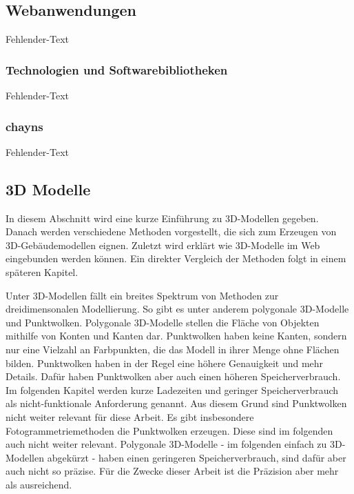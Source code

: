 \subsection{Webanwendungen}
Fehlender-Text

\subsubsection{Technologien und Softwarebibliotheken}
Fehlender-Text

\subsubsection{chayns}
Fehlender-Text

\subsection{3D Modelle}
In diesem Abschnitt wird eine kurze Einführung zu 3D-Modellen gegeben. Danach werden verschiedene Methoden vorgestellt, die sich zum Erzeugen von 3D-Gebäudemodellen eignen. Zuletzt wird erklärt wie 3D-Modelle im Web eingebunden werden können. Ein direkter Vergleich der Methoden folgt in einem späteren Kapitel.

Unter 3D-Modellen fällt ein breites Spektrum von Methoden zur dreidimensonalen Modellierung. So gibt es unter anderem polygonale 3D-Modelle und Punktwolken. Polygonale 3D-Modelle stellen die Fläche von Objekten mithilfe von Konten und Kanten dar. Punktwolken haben keine Kanten, sondern nur eine Vielzahl an Farbpunkten, die das Modell in ihrer Menge ohne Flächen bilden. Punktwolken haben in der Regel eine höhere Genauigkeit und mehr Details. Dafür haben Punktwolken aber auch einen höheren Speicherverbrauch. Im folgenden Kapitel werden kurze Ladezeiten und geringer Speicherverbrauch als nicht-funktionale Anforderung genannt. Aus diesem Grund sind Punktwolken nicht weiter relevant für diese Arbeit. Es gibt insbesondere Fotogrammetriemethoden die Punktwolken erzeugen. Diese sind im folgenden auch nicht weiter relevant. Polygonale 3D-Modelle - im folgenden einfach zu 3D-Modellen abgekürzt - haben einen geringeren Speicherverbrauch, sind dafür aber auch nicht so präzise. Für die Zwecke dieser Arbeit ist die Präzision aber mehr als ausreichend.

